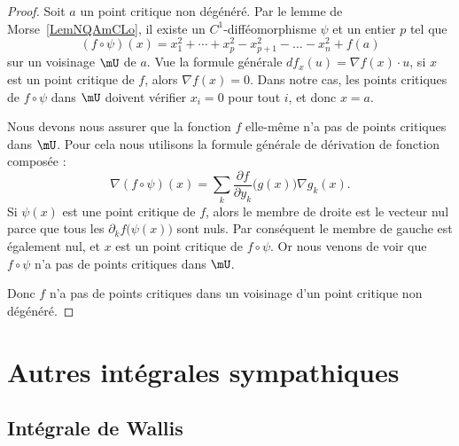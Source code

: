\begin{proof}
	Soit \( a\) un point critique non dégénéré. Par le lemme de Morse~\ref{LemNQAmCLo}, il existe un \( C^1\)-difféomorphisme \( \psi\) et un entier \( p\) tel que
	\begin{equation}
		(f\circ \psi)(x)=x_1^2+\cdots +x_p^2-x_{p+1}^2-\ldots -x_n^2+f(a)
	\end{equation}
	sur un voisinage \( \mU\) de \( a\). Vue la formule générale \( df_x(u)=\nabla f(x)\cdot u\), si \( x\) est un point critique de \( f\), alors \( \nabla f(x)=0\). Dans notre cas, les points critiques de \( f\circ \psi\) dans \( \mU\) doivent vérifier \( x_i=0\) pour tout \( i\), et donc \( x=a\).

	Nous devons nous assurer que la fonction \( f\) elle-même n'a pas de points critiques dans \( \mU\). Pour cela nous utilisons la formule générale de dérivation de fonction composée :
	\begin{equation}
		\nabla(f\circ\psi)(x)=\sum_k \frac{ \partial f }{ \partial y_k }\big( g(x) \big)\nabla g_k(x).
	\end{equation}
	Si \( \psi(x)\) est une point critique de \( f\), alors le membre de droite est le vecteur nul parce que tous les \( \partial_kf\big( \psi(x) \big)\) sont nuls. Par conséquent le membre de gauche est également nul, et \( x\) est un point critique de \( f\circ\psi\). Or nous venons de voir que \( f\circ\psi\) n'a pas de points critiques dans \( \mU\).

	Donc \( f\) n'a pas de points critiques dans un voisinage d'un point critique non dégénéré.
\end{proof}


\section{Autres intégrales sympathiques}

\subsection{Intégrale de Wallis}

